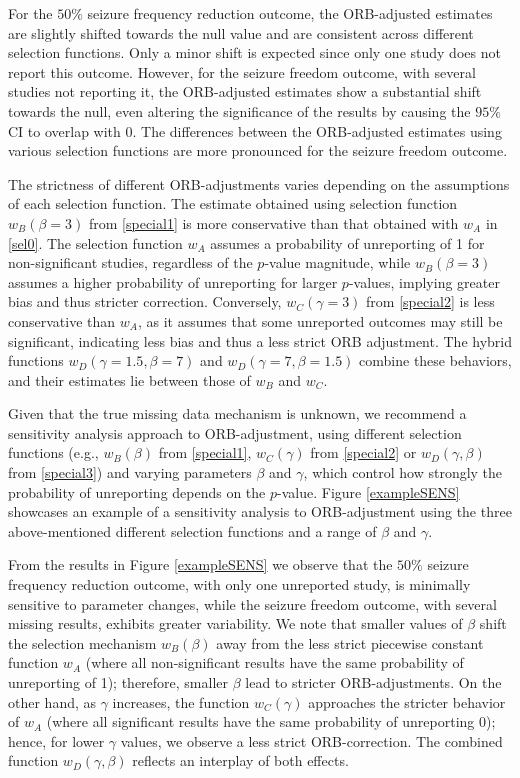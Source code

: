 \documentclass[twocolumn]{article}\usepackage[]{graphicx}\usepackage[]{xcolor}
\begin{document}
For the $50\%$ seizure frequency reduction outcome, the ORB-adjusted estimates are slightly shifted towards the null value and are consistent across different selection functions. Only a minor shift is expected since only one study does not report this outcome. However, for the seizure freedom outcome, with several studies not reporting it, the ORB-adjusted estimates show a substantial shift towards the null, even altering the significance of the results by causing the $95\%$ CI to overlap with 0. The differences between the ORB-adjusted estimates using various selection functions are more pronounced for the seizure freedom outcome.

The strictness of different ORB-adjustments varies depending on the assumptions of each selection function. The estimate obtained using selection function $w_B(\beta=3)$ from \eqref{special1} is more conservative than that obtained with $w_A$ in \eqref{sel0}. The selection function $w_A$ assumes a probability of unreporting of 1 for non-significant studies, regardless of the $p$-value magnitude, while $w_B(\beta=3)$ assumes a higher probability of unreporting for larger $p$-values, implying greater bias and thus stricter correction. Conversely, $w_C(\gamma=3)$ from \eqref{special2} is less conservative than $w_A$, as it assumes that some unreported outcomes may still be significant, indicating less bias and thus a less strict ORB adjustment. The hybrid functions $w_D(\gamma=1.5,\beta=7)$ and $w_D(\gamma=7,\beta=1.5)$ combine these behaviors, and their estimates lie between those of $w_B$ and $w_C$.

Given that the true missing data mechanism is unknown, we recommend a sensitivity analysis approach to ORB-adjustment, using different selection functions (e.g., $w_B(\beta)$ from \eqref{special1}, $w_C(\gamma)$ from \eqref{special2} or $w_D(\gamma, \beta)$ from \eqref{special3}) and varying parameters $\beta$ and $\gamma$, which control how strongly the probability of unreporting depends on the $p$-value. Figure \ref{exampleSENS} showcases an example of a sensitivity analysis to ORB-adjustment using the three above-mentioned different selection functions and a range of $\beta$ and $\gamma$.

From the results in Figure \ref{exampleSENS} we observe that the $50\%$ seizure frequency reduction outcome, with only one unreported study, is minimally sensitive to parameter changes, while the seizure freedom outcome, with several missing results, exhibits greater variability. We note that smaller values of $\beta$ shift the selection mechanism $w_B(\beta)$ away from the less strict piecewise constant function $w_A$ (where all non-significant results have the same probability of unreporting of 1); therefore, smaller $\beta$ lead to stricter ORB-adjustments. On the other hand, as $\gamma$ increases, the function $w_C(\gamma)$ approaches the stricter behavior of $w_A$ (where all significant results have the same probability of unreporting 0); hence, for lower $\gamma$ values, we observe a less strict ORB-correction. The combined function $w_D(\gamma, \beta)$ reflects an interplay of both effects.
\end{document}
